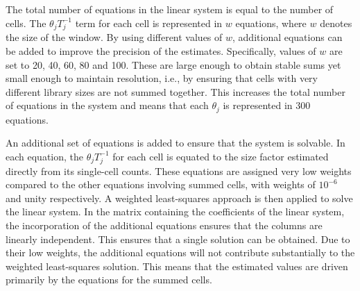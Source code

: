 \documentclass{article}
\begin{document}

The total number of equations in the linear system is equal to the number of cells.
The $\theta_jT_j^{-1}$ term for each cell is represented in $w$ equations, where $w$ denotes the size of the window.
By using different values of $w$, additional equations can be added to improve the precision of the estimates. 
Specifically, values of $w$ are set to 20, 40, 60, 80 and 100.
These are large enough to obtain stable sums yet small enough to maintain resolution, i.e., by ensuring that cells with very different library sizes are not summed together.
This increases the total number of equations in the system and means that each $\theta_j$ is represented in 300 equations. 

An additional set of equations is added to ensure that the system is solvable.
In each equation, the $\theta_jT_j^{-1}$ for each cell is equated to the size factor estimated directly from its single-cell counts.
These equations are assigned very low weights compared to the other equations involving summed cells, with weights of $10^{-6}$ and unity respectively.
A weighted least-squares approach is then applied to solve the linear system.
In the matrix containing the coefficients of the linear system, the incorporation of the additional equations ensures that the columns are linearly independent.
This ensures that a single solution can be obtained.
Due to their low weights, the additional equations will not contribute substantially to the weighted least-squares solution.
This means that the estimated values are driven primarily by the equations for the summed cells.
\end{document}
